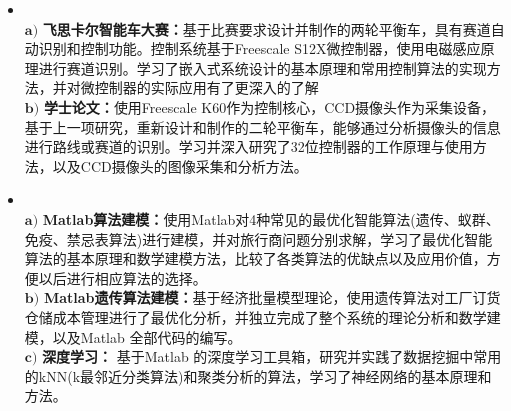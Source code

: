 \documentclass[zh]{resume}
\begin{document}
\begin{itemize}
	
	\item {}%
	\\
	$\mathbf{a)}$ \textbf{飞思卡尔智能车大赛：}基于比赛要求设计并制作的两轮平衡车，具有赛道自动识别和控制功能。控制系统基于Freescale S12X微控制器，使用电磁感应原理进行赛道识别。学习了嵌入式系统设计的基本原理和常用控制算法的实现方法，并对微控制器的实际应用有了更深入的了解\\
	$\mathbf{b)}$ \textbf{学士论文：}使用Freescale K60作为控制核心，CCD摄像头作为采集设备，基于上一项研究，重新设计和制作的二轮平衡车，能够通过分析摄像头的信息进行路线或赛道的识别。学习并深入研究了32位控制器的工作原理与使用方法，以及CCD摄像头的图像采集和分析方法。
	
	\item 
	\\
	$ \mathbf{a)}  $ \textbf{Matlab算法建模：}使用Matlab对4种常见的最优化智能算法(遗传、蚁群、免疫、禁忌表算法)进行建模，并对旅行商问题分别求解，学习了最优化智能算法的基本原理和数学建模方法，比较了各类算法的优缺点以及应用价值，方便以后进行相应算法的选择。\\
	$ \mathbf{b)}  $ \textbf{Matlab遗传算法建模：}基于经济批量模型理论，使用遗传算法对工厂订货仓储成本管理进行了最优化分析，并独立完成了整个系统的理论分析和数学建模，以及Matlab 全部代码的编写。\\
	$ \mathbf{c)}  $ \textbf{深度学习： }基于Matlab 的深度学习工具箱，研究并实践了数据挖掘中常用的kNN(k最邻近分类算法)和聚类分析的算法，学习了神经网络的基本原理和方法。
	
	
	
	
	
  		
\end{itemize}
\end{document}
